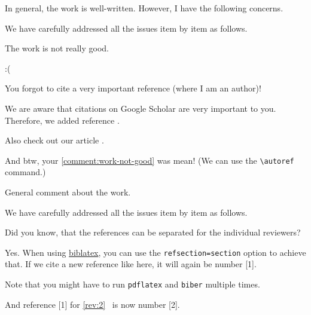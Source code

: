 \documentclass[12pt,english]{reviewresponse}
\begin{document}
\reviewer
\label{rev:2}
\begin{generalcomment}
	In general, the work is well-written. However, I have the following concerns.
\end{generalcomment}
\begin{revresponse}
	We have carefully addressed all the issues item by item as follows.
\end{revresponse}

\begin{revcomment}\label{comment:work-not-good}
	The work is not really good.
\end{revcomment}
\begin{revresponse}
	:(
\end{revresponse}

\begin{revcomment}
	You forgot to cite a very important reference (where I am an author)!
\end{revcomment}
\begin{revresponse}
	We are aware that citations on Google Scholar are very important to you.
	Therefore, we added reference \cite{ReviewerReference}.

	Also check out our article \cite{Besser2020}.

	And btw, your \autoref{comment:work-not-good} was mean! (We can use the \verb|\autoref| command.)

\end{revresponse}


\reviewer
\label{rev:3}
\begin{generalcomment}
	General comment about the work.
\end{generalcomment}
\begin{revresponse}
	We have carefully addressed all the issues item by item as follows.
\end{revresponse}

\begin{revcomment}
	Did you know, that the references can be separated for the individual reviewers?
\end{revcomment}
\begin{revresponse}
	Yes. When using \href{https://www.ctan.org/pkg/biblatex}{biblatex}, you can use the \texttt{refsection=section} option to achieve that.
	If we cite a new reference like \cite{Besser2021} here, it will again be number [1].

	Note that you might have to run \texttt{pdflatex} and \texttt{biber} multiple times.

	And reference [1] for \autoref{rev:2}~\cite{ReviewerReference} is now number [2].

\end{revresponse}
\end{document}
